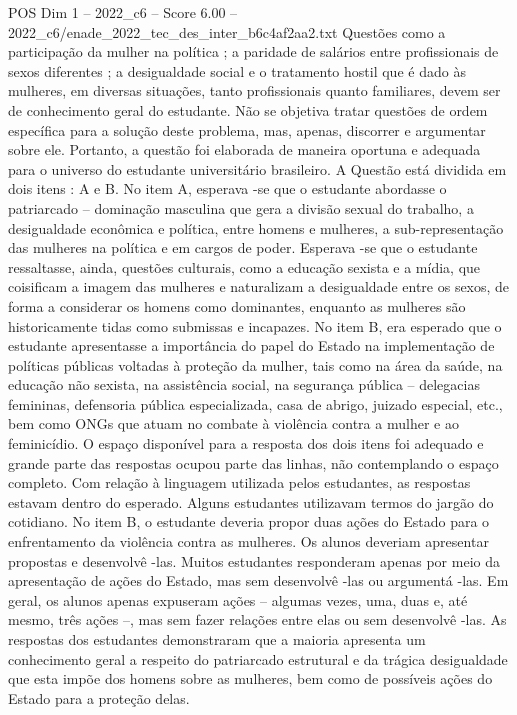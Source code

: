 \begin{textsample}{POS Dim 1 – 2022\_c6 – Score 6.00 – 2022\_c6/enade\_2022\_tec\_des\_inter\_b6c4af2aa2.txt}
Questões como a participação da mulher na política ; a paridade de salários entre profissionais de sexos diferentes ; a desigualdade social e o tratamento hostil que é dado às mulheres, em diversas situações, tanto profissionais quanto familiares, devem ser de conhecimento geral do estudante.
Não se objetiva tratar questões de ordem específica para a solução deste problema, mas, apenas, discorrer e argumentar sobre ele.
Portanto, a questão foi elaborada de maneira oportuna e adequada para o universo do estudante universitário brasileiro.
A Questão está dividida em dois itens : A e B.
No item A, esperava -se que o estudante abordasse o patriarcado – dominação masculina que gera a divisão sexual do trabalho, a desigualdade econômica e política, entre homens e mulheres, a sub-representação das mulheres na política e em cargos de poder.
Esperava -se que o estudante ressaltasse, ainda, questões culturais, como a educação sexista e a mídia, que coisificam a imagem das mulheres e naturalizam a desigualdade entre os sexos, de forma a considerar os homens como dominantes, enquanto as mulheres são historicamente tidas como submissas e incapazes.
No item B, era esperado que o estudante apresentasse a importância do papel do Estado na implementação de políticas públicas voltadas à proteção da mulher, tais como na área da saúde, na educação não sexista, na assistência social, na segurança pública – delegacias femininas, defensoria pública especializada, casa de abrigo, juizado especial, etc., bem como ONGs que atuam no combate à violência contra a mulher e ao feminicídio.
O espaço disponível para a resposta dos dois itens foi adequado e grande parte das respostas ocupou parte das linhas, não contemplando o espaço completo.
Com relação à linguagem utilizada pelos estudantes, as respostas estavam dentro do esperado.
Alguns estudantes utilizavam termos do jargão do cotidiano.
No item B, o estudante deveria propor duas ações do Estado para o enfrentamento da violência contra as mulheres.
Os alunos deveriam apresentar propostas e desenvolvê -las.
Muitos estudantes responderam apenas por meio da apresentação de ações do Estado, mas sem desenvolvê -las ou argumentá -las.
Em geral, os alunos apenas expuseram ações – algumas vezes, uma, duas e, até mesmo, três ações –, mas sem fazer relações entre elas ou sem desenvolvê -las.
As respostas dos estudantes demonstraram que a maioria apresenta um conhecimento geral a respeito do patriarcado estrutural e da trágica desigualdade que esta impõe dos homens sobre as mulheres, bem como de possíveis ações do Estado para a proteção delas.

\end{textsample}
